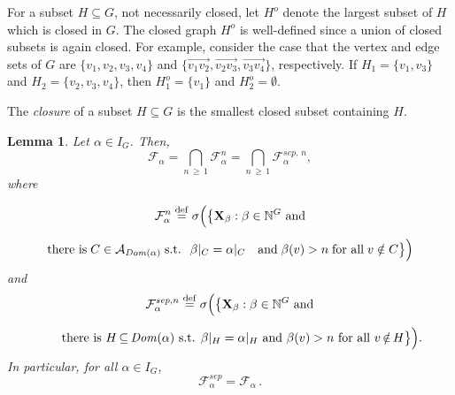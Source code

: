 \documentclass[10pt]{amsart}
\newtheorem{lemm}[theo]{Lemma}\newtheorem{prop}[theo]{Proposition}\newtheorem{coro}[theo]{Corollary}\newtheorem{conj}[theo]{Conjecture}
\theoremstyle{definition}\newtheorem{defi}[theo]{Definition}\newtheorem{rema}[theo]{Remark}\newtheorem{exam}[theo]{Example}\newtheorem{exem}[theo]{Example}\newtheorem{nota}[theo]{Notation}
\newcommand{\alf}{\alpha}%
\newcommand*\bb{\beta}
\newcommand*{\defeq}{\stackrel{\mathrm{def}}{=}}
\newcommand*{\sep}{\mathit{sep}}
\newcommand*\dom{\mathit{Dom}}
\newcommand*\N{\mathbb{N}}
\renewcommand{\AA}{\mathcal{A}}
\newcommand*\FF{\mathcal{F}}
\newcommand*\bX{\mathbf{X}}
\begin{document}
For a subset $H\subseteq G$, not necessarily closed, let $H^o$ denote the largest subset of $H$ which is closed in $G$. The closed graph $H^o$ is well-defined since a union of closed subsets is again closed. For example, consider the case that the vertex and edge sets of $G$ are $\{v_1,v_2,v_3,v_4\}$ and $\{\overrightarrow{v_1v_2}, \overrightarrow{v_2v_3}, \overrightarrow{v_3v_4}\}$, respectively. If $H_1=\{v_1,v_3\}$ and $H_2=\{v_2,v_3,v_4\}$, then $H_1^o=\{v_1\}$ and $H_2^o=\emptyset$.

The \emph{closure} of a subset $H \subseteq G$ is the smallest closed subset containing $H$.

\begin{lemm}\label{lem: symmetric variables with respect to X}
Let $\alf \in I_G$. Then,
\[
\FF_\alf = \bigcap_{n\,\geq\,1} \FF_\alf^n = \bigcap_{n\, \geq\,1} \mathcal{F}_\alf^{\sep,\,n},
\]
where

\begin{multline*}
\FF_\alf^n
\defeq\sigma\Big(\big\{
\bX_\bb: \bb \in \N^G \text{ \rm and}
\\[0.5em]
\text{there is}\;C \;{\in}\; \AA_{\dom(\alf)}\;\text{\rm s.t. }\;\bb|_C=\alf|_C\quad\text{\rm and}\;\bb(v)>n\;\text{\rm for all}\;v\;{\notin}\; C\big\}\Big)
\end{multline*}
and
\begin{multline*}
\mathcal{F}^{\sep,n}_\alf
\defeq\sigma\Big(\big\{
\bX_\bb: \bb \in \N^G \text{ \rm and}
\\[0.5em]
\qquad
\text{there is } H \,{\subseteq}\, \dom(\alf) \text{ \rm s.t. } \bb|_H=\alf|_H \text{ \rm and } \bb(v)>n \text{ \rm for all } v \,{\notin}\, H\big\}\Big).
\end{multline*}
In particular, for all $\alf\in I_G$,
\[
\FF_\alf ^{\sep}=\FF_\alf\,.
\]
\end{lemm}
\end{document}
